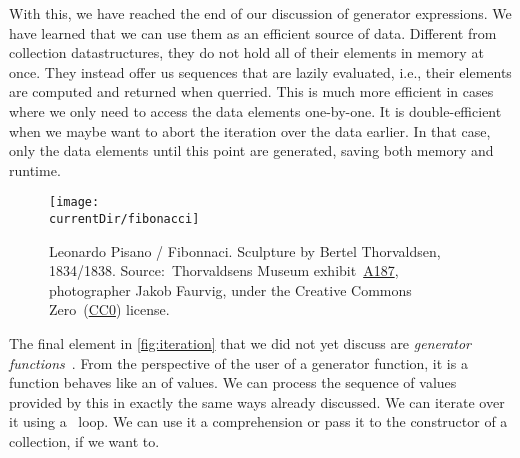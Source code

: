With this, we have reached the end of our discussion of generator expressions.
We have learned that we can use them as an efficient source of data.
Different from collection datastructures, they do not hold all of their elements in memory at once.
They instead offer us sequences that are lazily evaluated, i.e., their elements are computed and returned when querried.
This is much more efficient in cases where we only need to access the data elements one-by-one.
It is double-efficient when we maybe want to abort the iteration over the data earlier.
In that case, only the data elements until this point are generated, saving both memory and runtime.%
%
\FloatBarrier%
\endhsection%
%
%
\FloatBarrier%
%
%
%
%
\begin{figure}%
\centering%
\texttt{[image: \\currentDir/fibonacci]}%
\caption{%
Leonardo Pisano / Fibonnaci. Sculpture by Bertel Thorvaldsen, 1834/1838. %
Source:~Thorvaldsens Museum exhibit~\href{https://kataloget.thorvaldsensmuseum.dk/A187}{A187}, photographer Jakob Faurvig, under the Creative Commons Zero~(\href{https://creativecommons.org/publicdomain/zero/1.0}{CC0}) license.%
}%
\label{fig:fibonacci}%
\end{figure}%
%
%
%
%
%
%
%
%
%
%
The final element in \cref{fig:iteration} that we did not yet discuss are \emph{generator functions}~\cite{PEP255}.
From the perspective of the user of a generator function, it is a function behaves like an  of values.
We can process the sequence of values provided by this  in exactly the same ways already discussed.
We can iterate over it using a ~loop.
We can use it a comprehension or pass it to the constructor of a collection, if we want to.

